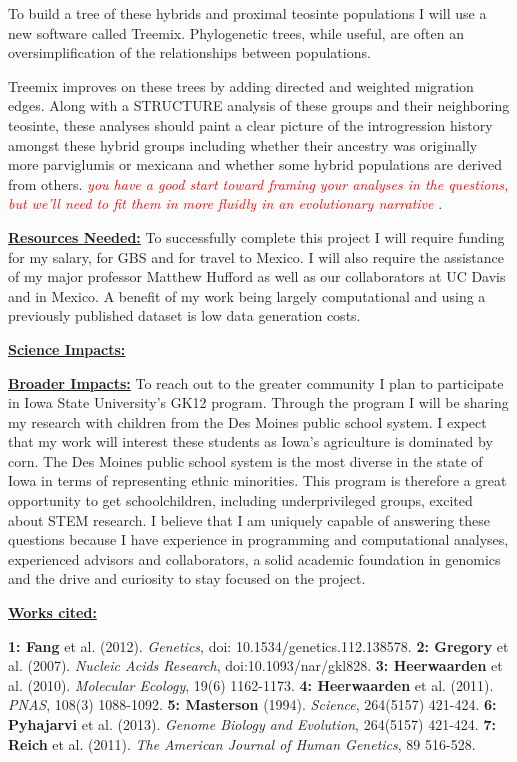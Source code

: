 \documentclass[12pt]{amsart}
\newcommand{\mbh}[1]{\textcolor{red}{ \emph{\scriptsize  #1}} }
\begin{document}
To build a tree of these hybrids and proximal teosinte populations I will use a new software called Treemix.
Phylogenetic trees, while useful, are often an oversimplification of the relationships between populations.%

Treemix improves on these trees by adding directed and weighted migration edges.%
Along with a STRUCTURE analysis of these groups and their neighboring teosinte, these analyses should paint a clear picture of the introgression history amongst these hybrid groups including whether their ancestry was originally more parviglumis or mexicana and whether some hybrid populations are derived from others.
\mbh{you have a good start toward framing your analyses in the questions, but we'll need to fit them in more fluidly in an evolutionary narrative}.

\hfill\break \textbf{\underline{Resources Needed:} } To successfully complete this project I will require funding for my salary, for GBS and for travel to Mexico.  I will also require the assistance of my major professor Matthew Hufford as well as our collaborators at UC Davis and in Mexico.
A benefit of my work being largely computational and using a previously published dataset is low data generation costs.

\hfill\break \textbf{\underline{Science Impacts:} }

\hfill\break \textbf{\underline{Broader Impacts:} }
To reach out to the greater community I plan to participate in Iowa State University's GK12 program.  Through the program I will be sharing my research with children from the Des Moines public school system.  
I expect that my work will interest these students as Iowa's agriculture is dominated by corn.
The Des Moines public school system is the most diverse in the state of Iowa in terms of representing ethnic minorities.  This program is therefore a great opportunity to get schoolchildren, including underprivileged groups, excited about STEM research.  
I believe that I am uniquely capable of answering these questions because I have experience in programming and computational analyses, experienced advisors and collaborators, a solid academic foundation in genomics and the drive and curiosity to stay focused on the project.

\hfill\break \textbf{\underline{Works cited:}}
\small{ 
\textbf{1: Fang} et al. (2012). \textit{Genetics}, doi: 10.1534/genetics.112.138578. 
\textbf{2: Gregory} et al. (2007). \textit{Nucleic Acids Research}, doi:10.1093/nar/gkl828. 
\textbf{3: Heerwaarden} et al. (2010). \textit{Molecular Ecology}, 19(6) 1162-1173. 
\textbf{4: Heerwaarden} et al. (2011). \textit{PNAS}, 108(3) 1088-1092.  
\textbf{5: Masterson} (1994). \textit{Science}, 264(5157) 421-424.  
\textbf{6: Pyhajarvi} et al. (2013). \textit{Genome Biology and Evolution}, 264(5157) 421-424.  
\textbf{7: Reich} et al. (2011). \textit{The American Journal of Human Genetics}, 89 516-528.

}
\end{document}
